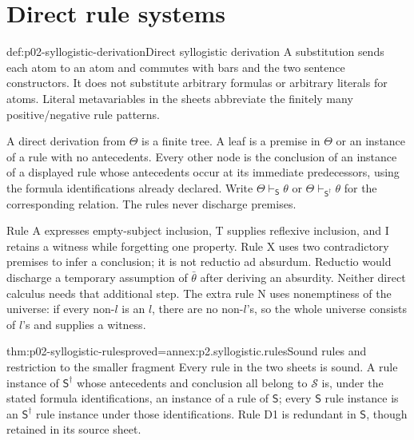 \section{Direct rule systems}

\begin{hbdefinition}{def:p02-syllogistic-derivation}{Direct syllogistic derivation}
A substitution sends each atom to an atom and commutes with bars and the two
sentence constructors. It does not substitute arbitrary formulas or arbitrary
literals for atoms. Literal metavariables in the sheets abbreviate the
finitely many positive/negative rule patterns.

A direct derivation from \(\Theta\) is a finite tree. A leaf is a premise in
\(\Theta\) or an instance of a rule with no antecedents. Every other node is
the conclusion of an instance of a displayed rule whose antecedents occur
at its immediate predecessors, using the formula identifications already
declared. Write \(\Theta\vdash_{\mathsf S}\theta\) or
\(\Theta\vdash_{\mathsf S^\dagger}\theta\) for the corresponding relation.
The rules never discharge premises.
\end{hbdefinition}


Rule A expresses empty-subject inclusion, T supplies reflexive inclusion,
and I retains a witness while forgetting one property. Rule X uses two
contradictory premises to infer a conclusion; it is not reductio ad absurdum.
Reductio would discharge a temporary assumption of \(\bar\theta\) after
deriving an absurdity. Neither direct calculus needs that additional step.
The extra rule N uses nonemptiness of the universe: if every non-\(l\)
is an \(l\), there are no non-\(l\)'s, so the whole universe consists of
\(l\)'s and supplies a witness.

\begin{hblemma}{thm:p02-syllogistic-rules}{proved=annex:p2.syllogistic.rules}{Sound rules and restriction to the smaller fragment}
Every rule in the two sheets is sound. A rule instance of
\(\mathsf S^\dagger\) whose antecedents and conclusion all belong to
\(\mathcal S\) is, under the stated formula identifications, an instance
of a rule of \(\mathsf S\); every \(\mathsf S\) rule instance is an
\(\mathsf S^\dagger\) rule instance under those identifications.
Rule D1 is redundant in \(\mathsf S\), though retained in its source sheet.
\end{hblemma}

